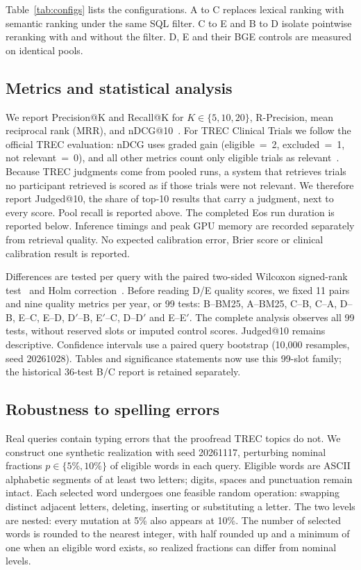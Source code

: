 \documentclass{article}
\begin{document}
Table~\ref{tab:configs} lists the configurations. A to C replaces lexical ranking with semantic ranking under the same SQL filter. C to E and B to D isolate pointwise reranking with and without the filter. D, E and their BGE controls are measured on identical pools.

\subsection{Metrics and statistical analysis}

We report Precision@K and Recall@K for $K \in \{5, 10, 20\}$, R-Precision, mean reciprocal rank (MRR), and nDCG@10~\citep{jarvelin2002ndcg}. For TREC Clinical Trials we follow the official TREC evaluation: nDCG uses graded gain (eligible~=~2, excluded~=~1, not relevant~=~0), and all other metrics count only eligible trials as relevant~\citep{roberts2022trecct}. Because TREC judgments come from pooled runs, a system that retrieves trials no participant retrieved is scored as if those trials were not relevant. We therefore report Judged@10, the share of top-10 results that carry a judgment, next to every score. Pool recall is reported above. The completed Eos run duration is reported below. Inference timings and peak GPU memory are recorded separately from retrieval quality. No expected calibration error, Brier score or clinical calibration result is reported.

Differences are tested per query with the paired two-sided Wilcoxon signed-rank test~\citep{wilcoxon1945} and Holm correction~\citep{holm1979}. Before reading D/E quality scores, we fixed 11 pairs and nine quality metrics per year, or 99 tests: B--BM25, A--BM25, C--B, C--A, D--B, E--C, E--D, D$'$--B, E$'$--C, D--D$'$ and E--E$'$. The complete analysis observes all 99 tests, without reserved slots or imputed control scores. Judged@10 remains descriptive. Confidence intervals use a paired query bootstrap (10{,}000 resamples, seed 20261028). Tables and significance statements now use this 99-slot family; the historical 36-test B/C report is retained separately.

\subsection{Robustness to spelling errors}

Real queries contain typing errors that the proofread TREC topics do not. We construct one synthetic realization with seed 20261117, perturbing nominal fractions $p \in \{5\%, 10\%\}$ of eligible words in each query. Eligible words are ASCII alphabetic segments of at least two letters; digits, spaces and punctuation remain intact. Each selected word undergoes one feasible random operation: swapping distinct adjacent letters, deleting, inserting or substituting a letter. The two levels are nested: every mutation at 5\% also appears at 10\%. The number of selected words is rounded to the nearest integer, with half rounded up and a minimum of one when an eligible word exists, so realized fractions can differ from nominal levels.
\end{document}
